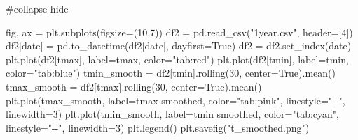 \documentclass[
  letterpaper,
  DIV=11,
  numbers=noendperiod]{scrreprt}
\newenvironment{Shaded}{\begin{snugshade}}{\end{snugshade}}
\newcommand{\CommentTok}[1]{\textcolor[rgb]{0.37,0.37,0.37}{#1}}
\newcommand{\DecValTok}[1]{\textcolor[rgb]{0.68,0.00,0.00}{#1}}
\newcommand{\NormalTok}[1]{\textcolor[rgb]{0.00,0.23,0.31}{#1}}
\newcommand{\OperatorTok}[1]{\textcolor[rgb]{0.37,0.37,0.37}{#1}}
\newcommand{\StringTok}[1]{\textcolor[rgb]{0.13,0.47,0.30}{#1}}
\newcommand{\VariableTok}[1]{\textcolor[rgb]{0.07,0.07,0.07}{#1}}
\begin{document}
\begin{Shaded}
\begin{Highlighting}[]
\CommentTok{\#collapse{-}hide}

\NormalTok{fig, ax }\OperatorTok{=}\NormalTok{ plt.subplots(figsize}\OperatorTok{=}\NormalTok{(}\DecValTok{10}\NormalTok{,}\DecValTok{7}\NormalTok{))}
\NormalTok{df2 }\OperatorTok{=}\NormalTok{ pd.read\_csv(}\StringTok{"1year.csv"}\NormalTok{, header}\OperatorTok{=}\NormalTok{[}\DecValTok{4}\NormalTok{])}
\NormalTok{df2[}\StringTok{\textquotesingle{}date\textquotesingle{}}\NormalTok{] }\OperatorTok{=}\NormalTok{ pd.to\_datetime(df2[}\StringTok{\textquotesingle{}date\textquotesingle{}}\NormalTok{], dayfirst}\OperatorTok{=}\VariableTok{True}\NormalTok{)}
\NormalTok{df2 }\OperatorTok{=}\NormalTok{ df2.set\_index(}\StringTok{\textquotesingle{}date\textquotesingle{}}\NormalTok{)}
\NormalTok{plt.plot(df2[}\StringTok{\textquotesingle{}tmax\textquotesingle{}}\NormalTok{], label}\OperatorTok{=}\StringTok{\textquotesingle{}tmax\textquotesingle{}}\NormalTok{, color}\OperatorTok{=}\StringTok{"tab:red"}\NormalTok{)}
\NormalTok{plt.plot(df2[}\StringTok{\textquotesingle{}tmin\textquotesingle{}}\NormalTok{], label}\OperatorTok{=}\StringTok{\textquotesingle{}tmin\textquotesingle{}}\NormalTok{, color}\OperatorTok{=}\StringTok{"tab:blue"}\NormalTok{)}
\NormalTok{tmin\_smooth }\OperatorTok{=}\NormalTok{ df2[}\StringTok{\textquotesingle{}tmin\textquotesingle{}}\NormalTok{].rolling(}\DecValTok{30}\NormalTok{, center}\OperatorTok{=}\VariableTok{True}\NormalTok{).mean()}
\NormalTok{tmax\_smooth }\OperatorTok{=}\NormalTok{ df2[}\StringTok{\textquotesingle{}tmax\textquotesingle{}}\NormalTok{].rolling(}\DecValTok{30}\NormalTok{, center}\OperatorTok{=}\VariableTok{True}\NormalTok{).mean()}
\NormalTok{plt.plot(tmax\_smooth, label}\OperatorTok{=}\StringTok{\textquotesingle{}tmax smoothed\textquotesingle{}}\NormalTok{, color}\OperatorTok{=}\StringTok{"tab:pink"}\NormalTok{, linestyle}\OperatorTok{=}\StringTok{"{-}{-}"}\NormalTok{, linewidth}\OperatorTok{=}\DecValTok{3}\NormalTok{)}
\NormalTok{plt.plot(tmin\_smooth, label}\OperatorTok{=}\StringTok{\textquotesingle{}tmin smoothed\textquotesingle{}}\NormalTok{, color}\OperatorTok{=}\StringTok{"tab:cyan"}\NormalTok{, linestyle}\OperatorTok{=}\StringTok{"{-}{-}"}\NormalTok{, linewidth}\OperatorTok{=}\DecValTok{3}\NormalTok{)}
\NormalTok{plt.legend()}
\NormalTok{plt.savefig(}\StringTok{"t\_smoothed.png"}\NormalTok{)}
\end{Highlighting}
\end{Shaded}
\end{document}
